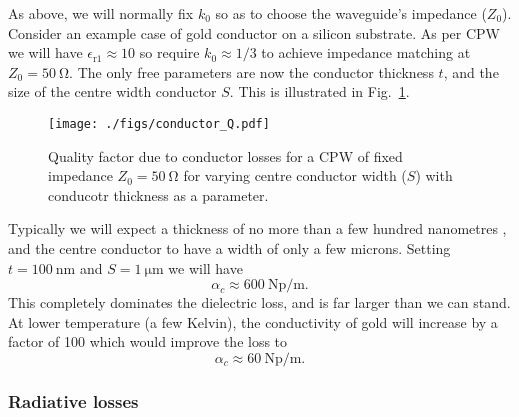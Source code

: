 

As above, we will normally fix $k_0$ so as to choose the waveguide's impedance
($Z_0$). Consider an example case of gold conductor on a silicon substrate. As
per CPW\cite{1127105}  we will have $\epsilon_\mathrm{r1} \approx 10$ so require $k_0
\approx 1/3$ to achieve impedance matching at $Z_0 = \SI{50}{\ohm}$. The only
free parameters are now the conductor thickness $t$, and the size of the centre
width conductor $S$. This is illustrated in Fig.~\ref{fig:conductorQ}.

\begin{figure}
  \texttt{[image: ./figs/conductor\_Q.pdf]}
  \caption{Quality factor due to conductor losses for a CPW of fixed impedance
  $Z_0=\SI{50}{\ohm}$ for varying centre conductor width ($S$) with conducotr
  thickness as a parameter.}
  \label{fig:conductorQ}
\end{figure}

Typically we will expect a thickness of no more than a few hundred nanometres
,
and the centre conductor to have a width of only a few microns. Setting
$t=\SI{100}{\nano\metre}$ and $S=\SI{1}{\micro\metre}$ we will have
\begin{equation}
  \alpha_c \approx \SI{600}{\neper \per \meter}.
\end{equation}
This completely dominates the dielectric loss, and is far larger than we can
stand. At lower temperature (a few Kelvin), the conductivity of gold will
increase by a factor of 100 which would improve the loss to
\begin{equation}
  \alpha_c \approx \SI{60}{\neper \per \meter}.
\end{equation}


\subsubsection*{Radiative losses}

